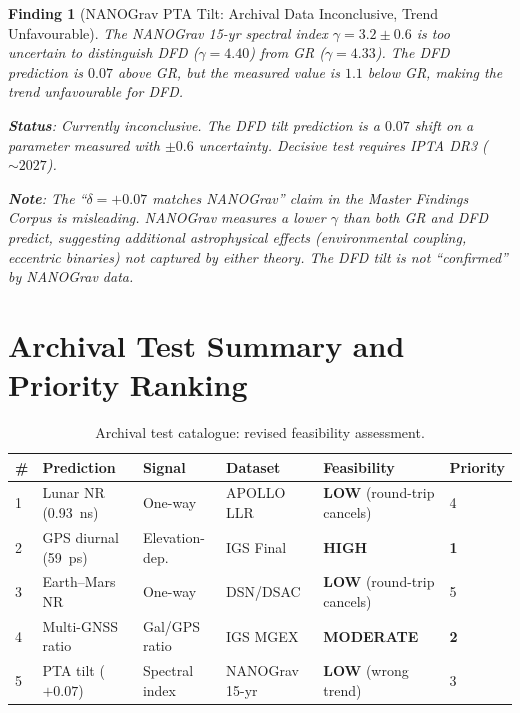 \documentclass[11pt]{article}
\newtheorem{finding}{Finding}
\begin{document}
\begin{finding}[NANOGrav PTA Tilt: Archival Data Inconclusive, Trend Unfavourable]
\label{find:PTA-archival}
The NANOGrav 15-yr spectral index $\gamma = 3.2 \pm 0.6$ is too
uncertain to distinguish DFD ($\gamma = 4.40$) from GR ($\gamma = 4.33$).
The DFD prediction is $0.07$ above GR, but the measured value is
$1.1$ \emph{below} GR, making the trend unfavourable for DFD.

\textbf{Status}: Currently inconclusive. The DFD tilt prediction is
a $0.07$ shift on a parameter measured with $\pm 0.6$ uncertainty.
Decisive test requires IPTA DR3 ($\sim 2027$).

\textbf{Note}: The ``$\delta = +0.07$ matches NANOGrav'' claim in the
Master Findings Corpus is misleading. NANOGrav measures a \emph{lower}
$\gamma$ than both GR and DFD predict, suggesting additional astrophysical
effects (environmental coupling, eccentric binaries) not captured by
either theory. The DFD tilt is not ``confirmed'' by NANOGrav data.
\end{finding}

\section{Archival Test Summary and Priority Ranking}
\label{sec:archival-summary}

\begin{table}[H]
\centering
\caption{Archival test catalogue: revised feasibility assessment.}
\begin{tabular}{p{0.4cm}p{2.5cm}p{2cm}p{2cm}p{2cm}p{2cm}}
\toprule
\# & Prediction & Signal & Dataset & Feasibility & Priority \\
\midrule
1 & Lunar NR (0.93~ns) & One-way & APOLLO LLR & \textbf{LOW} (round-trip cancels) & 4 \\
2 & GPS diurnal (59~ps) & Elevation-dep. & IGS Final & \textbf{HIGH} & \textbf{1} \\
3 & Earth--Mars NR & One-way & DSN/DSAC & \textbf{LOW} (round-trip cancels) & 5 \\
4 & Multi-GNSS ratio & Gal/GPS ratio & IGS MGEX & \textbf{MODERATE} & \textbf{2} \\
5 & PTA tilt ($+0.07$) & Spectral index & NANOGrav 15-yr & \textbf{LOW} (wrong trend) & 3 \\
\bottomrule
\end{tabular}
\end{table}
\end{document}
